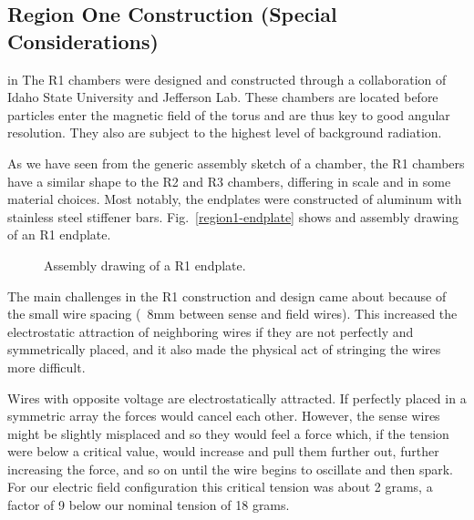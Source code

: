 \subsection{Region One Construction (Special Considerations)}

 in 
The R1 chambers were designed and constructed through a collaboration 
of Idaho State University and Jefferson Lab.  These 
chambers are located before particles enter the magnetic field of the torus
and are thus key to good angular resolution.  They also are subject to the
highest level of background radiation. 

As we have seen from the generic assembly sketch of a chamber, the R1
chambers have a similar shape to the R2 and R3 chambers, differing in
scale and in some material choices.
Most notably, the endplates were constructed of aluminum with stainless
steel stiffener bars.
Fig.~\ref{region1-endplate} shows and assembly drawing of an R1 endplate.


\begin{figure}[htpb]   
\vspace{7.0cm}

\caption{\small{Assembly drawing of a R1 endplate.}}
\label{region1}
\end{figure}   

The main challenges in the R1 construction and design came about because
of the small wire spacing (~8mm between sense and field wires).  This
increased the electrostatic attraction of neighboring wires if they are
not perfectly and symmetrically placed, and it also made the physical act
of stringing the wires more difficult.

Wires with opposite voltage are electrostatically attracted.  If perfectly
placed in a symmetric array the forces would cancel each other. 
However, the sense wires might be slightly misplaced and so they would feel
a force which, if the tension were below a critical value, would increase
and pull them further out, further increasing the force, and so on until 
the wire begins to oscillate and then spark.  For our electric field configuration
this critical tension was about 2 grams, a factor of 9 below our nominal
tension of 18 grams.

